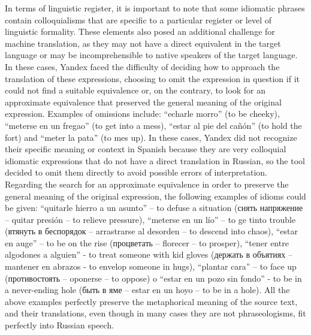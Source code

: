 In terms of linguistic register, it is important to note that some
idiomatic phrases contain colloquialisms that are specific to a
particular register or level of linguistic formality. These elements
also posed an additional challenge for machine translation, as they may
not have a direct equivalent in the target language or may be
incomprehensible to native speakers of the target language. In these
cases, Yandex faced the difficulty of deciding how to approach the
translation of these expressions, choosing to omit the expression in
question if it could not find a suitable equivalence or, on the
contrary, to look for an approximate equivalence that preserved the
general meaning of the original expression. Examples of omissions
include: ``echarle morro'' (to be cheeky), ``meterse en un fregao'' (to
get into a mess), ``estar al pie del cañón'' (to hold the fort) and
``meter la pata'' (to mes up). In these cases, Yandex did not recognize
their specific meaning or context in Spanish because they are very
colloquial idiomatic expressions that do not have a direct translation
in Russian, so the tool decided to omit them directly to avoid possible
errors of interpretation. Regarding the search for an approximate
equivalence in order to preserve the general meaning of the original
expression, the following examples of idioms could be given: ``quitarle
hierro a un asunto'' -- to defuse a situation (\textrussian{снять напряжение} --
quitar presión -- to relieve pressure), ``meterse en un lío'' -- to ge
tinto trouble (\textrussian{втянуть в беспорядок} -- arrastrarse al desorden -- to
descend into chaos), ``estar en auge'' -- to be on the rise (\textrussian{процветать}
-- florecer -- to prosper), ``tener entre algodones a alguien'' - to
treat someone with kid gloves (\textrussian{держать в объятиях} -- mantener en abrazos
- to envelop someone in hugs), ``plantar cara'' -- to face up
(\textrussian{противостоять} -- oponerse -- to oppose) o ``estar en un pozo sin
fondo'' - to be in a never-ending hole (\textrussian{быть в яме} -- estar en un hoyo
-- to be in a hole). All the above examples perfectly preserve the
metaphorical meaning of the source text, and their translations, even
though in many cases they are not phraseologisms, fit perfectly into
Russian speech.

